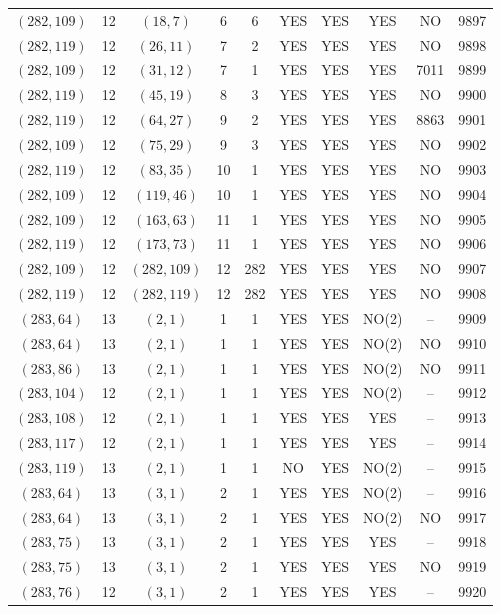 \begin{longtable}{|c|c|c|c|c|c|c|c|c|c|}
$(282, 109)$ & 12 & $(18, 7)$ & 6 & 6 & YES & YES & YES & NO & 9897\\
$(282, 119)$ & 12 & $(26, 11)$ & 7 & 2 & YES & YES & YES & NO & 9898\\
$(282, 109)$ & 12 & $(31, 12)$ & 7 & 1 & YES & YES & YES & 7011 & 9899\\
$(282, 119)$ & 12 & $(45, 19)$ & 8 & 3 & YES & YES & YES & NO & 9900\\
$(282, 119)$ & 12 & $(64, 27)$ & 9 & 2 & YES & YES & YES & 8863 & 9901\\
$(282, 109)$ & 12 & $(75, 29)$ & 9 & 3 & YES & YES & YES & NO & 9902\\
$(282, 119)$ & 12 & $(83, 35)$ & 10 & 1 & YES & YES & YES & NO & 9903\\
$(282, 109)$ & 12 & $(119, 46)$ & 10 & 1 & YES & YES & YES & NO & 9904\\
$(282, 109)$ & 12 & $(163, 63)$ & 11 & 1 & YES & YES & YES & NO & 9905\\
$(282, 119)$ & 12 & $(173, 73)$ & 11 & 1 & YES & YES & YES & NO & 9906\\
$(282, 109)$ & 12 & $(282, 109)$ & 12 & 282 & YES & YES & YES & NO & 9907\\
$(282, 119)$ & 12 & $(282, 119)$ & 12 & 282 & YES & YES & YES & NO & 9908\\
$(283, 64)$ & 13 & $(2, 1)$ & 1 & 1 & YES & YES & NO(2) & -- & 9909\\
$(283, 64)$ & 13 & $(2, 1)$ & 1 & 1 & YES & YES & NO(2) & NO & 9910\\
$(283, 86)$ & 13 & $(2, 1)$ & 1 & 1 & YES & YES & NO(2) & NO & 9911\\
$(283, 104)$ & 12 & $(2, 1)$ & 1 & 1 & YES & YES & NO(2) & -- & 9912\\
$(283, 108)$ & 12 & $(2, 1)$ & 1 & 1 & YES & YES & YES & -- & 9913\\
$(283, 117)$ & 12 & $(2, 1)$ & 1 & 1 & YES & YES & YES & -- & 9914\\
$(283, 119)$ & 13 & $(2, 1)$ & 1 & 1 & NO & YES & NO(2) & -- & 9915\\
$(283, 64)$ & 13 & $(3, 1)$ & 2 & 1 & YES & YES & NO(2) & -- & 9916\\
$(283, 64)$ & 13 & $(3, 1)$ & 2 & 1 & YES & YES & NO(2) & NO & 9917\\
$(283, 75)$ & 13 & $(3, 1)$ & 2 & 1 & YES & YES & YES & -- & 9918\\
$(283, 75)$ & 13 & $(3, 1)$ & 2 & 1 & YES & YES & YES & NO & 9919\\
$(283, 76)$ & 12 & $(3, 1)$ & 2 & 1 & YES & YES & YES & -- & 9920\\

\end{longtable}
